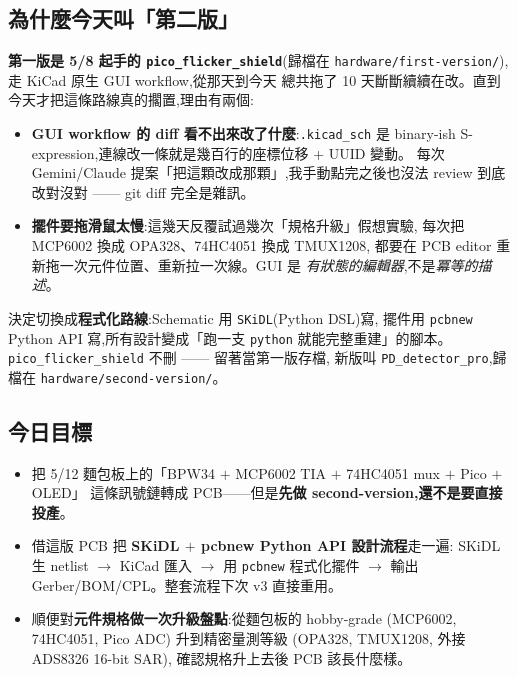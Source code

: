 
\subsection*{為什麼今天叫「第二版」}

\textbf{第一版是 5/8 起手的 \texttt{pico\_flicker\_shield}}(歸檔在
\texttt{hardware/first-version/}),走 KiCad 原生 GUI workflow,從那天到今天
總共拖了 10 天斷斷續續在改。直到今天才把這條路線真的擱置,理由有兩個:

\begin{itemize}[leftmargin=2em,itemsep=0pt]
  \item \textbf{GUI workflow 的 diff 看不出來改了什麼}:\texttt{.kicad\_sch} 是 binary-ish
        S-expression,連線改一條就是幾百行的座標位移 + UUID 變動。
        每次 Gemini/Claude 提案「把這顆改成那顆」,我手動點完之後也沒法 review
        到底改對沒對 —— git diff 完全是雜訊。
  \item \textbf{擺件要拖滑鼠太慢}:這幾天反覆試過幾次「規格升級」假想實驗,
        每次把 MCP6002 換成 OPA328、74HC4051 換成 TMUX1208,
        都要在 PCB editor 重新拖一次元件位置、重新拉一次線。GUI 是
        \emph{有狀態的編輯器},不是\emph{冪等的描述}。
\end{itemize}

決定切換成\textbf{程式化路線}:Schematic 用 \texttt{SKiDL}(Python DSL)寫,
擺件用 \texttt{pcbnew} Python API 寫,所有設計變成「跑一支 \texttt{python}
就能完整重建」的腳本。\texttt{pico\_flicker\_shield} 不刪 —— 留著當第一版存檔,
新版叫 \texttt{PD\_detector\_pro},歸檔在 \texttt{hardware/second-version/}。

\subsection*{今日目標}

\begin{itemize}[leftmargin=2em,itemsep=0pt]
  \item 把 5/12 麵包板上的「BPW34 \(+\) MCP6002 TIA \(+\) 74HC4051 mux \(+\) Pico \(+\) OLED」
        這條訊號鏈轉成 PCB——但是\textbf{先做 second-version,還不是要直接投產}。
  \item 借這版 PCB 把 \textbf{SKiDL \(+\) pcbnew Python API 設計流程}走一遍:
        SKiDL 生 netlist \(\to\) KiCad 匯入 \(\to\) 用 \texttt{pcbnew} 程式化擺件 \(\to\)
        輸出 Gerber/BOM/CPL。整套流程下次 v3 直接重用。
  \item 順便對\textbf{元件規格做一次升級盤點}:從麵包板的 hobby-grade
        (MCP6002, 74HC4051, Pico ADC) 升到精密量測等級
        (OPA328, TMUX1208, 外接 ADS8326 16-bit SAR),
        確認規格升上去後 PCB 該長什麼樣。
\end{itemize}


